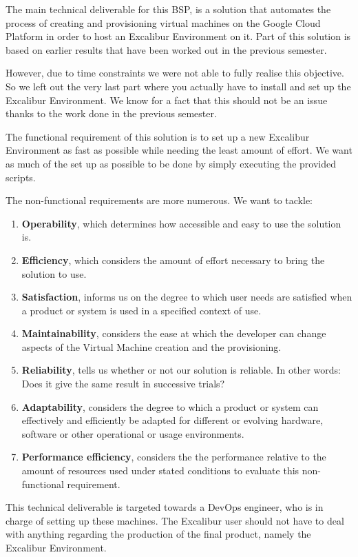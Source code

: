 The main technical deliverable for this BSP, is a solution that
automates the process of creating and provisioning virtual machines on
the Google Cloud Platform in order to host an Excalibur Environment on
it. Part of this solution is based on earlier results that have been
worked out in the previous semester. 

However, due to time constraints we were not able to fully realise
this objective. So we left out the very last part where you actually
have to install and set up the Excalibur Environment. We know for a
fact that this should not be an issue thanks to the work done in the
previous semester.

The functional requirement of this solution is to set up a new
Excalibur Environment as fast as possible while needing the least
amount of effort. We want as much of the set up as possible to be done
by simply executing the provided scripts.

The non-functional requirements are more numerous. We want to tackle:
\begin{enumerate}

	\item \textbf{Operability}\cite{ISO-IEC}, which determines how
	accessible and easy to use the solution is.

	\item \textbf{Efficiency}\cite{ISO-IEC}, which considers the
	amount of effort necessary to bring the solution to use.
		
	\item \textbf{Satisfaction}\cite{ISO-IEC}, informs us on the
	degree to which user needs are satisfied when a product or system
	is used in a specified context of use.
		
	
	\item \textbf{Maintainability}\cite{ISO-IEC}, considers the ease
	at which the developer can change aspects of the Virtual Machine
	creation and the provisioning.
		
	\item \textbf{Reliability}\cite{ISO-IEC}, tells us whether or not
	our solution is reliable. In other words: Does it give the same
	result in successive trials?

	\item \textbf{Adaptability}\cite{ISO-IEC}, considers the degree to
	which a product or system can effectively and efficiently be
	adapted for different or evolving hardware, software or other
	operational or usage environments.

	\item \textbf{Performance efficiency}\cite{ISO-IEC}, considers the
	the performance relative to the amount of resources used under
	stated conditions to evaluate this non-functional requirement.

		
\end{enumerate}

This technical deliverable is targeted towards a DevOps engineer, who
is in charge of setting up these machines. The Excalibur user should
not have to deal with anything regarding the production of the final
product, namely the Excalibur Environment.

